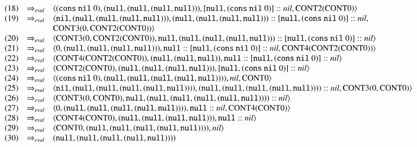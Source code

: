\documentclass{article}
\begin{document}
\[\begin{array}{crl}
  (18) & \estep & \langle
  (\cons~\nil~0),
  (\null, (\null, (\null, \null))),
  [\null, (\cons~\nil~0)] :: \nils,
  \cont{2}(\cont{0})
  \rangle \\

  (19) & \estep & \langle
  \nil,
  (\null, (\null, (\null, \null))),
  (\null, (\null, (\null, \null))) :: [\null, (\cons~\nil~0)] :: \nils,\\
  & \br &
  \cont{3}(0, \cont{2}(\cont{0}))
  \rangle \\

  (20) & \estep & \langle
  \cont{3}(0, \cont{2}(\cont{0})),
  \null,
  (\null, (\null, (\null, \null))) :: [\null, (\cons~\nil~0)] :: \nils
  \rangle \\


  (21) & \estep & \langle
  0,
  (\null, (\null, (\null, \null))),
  \null :: [\null, (\cons~\nil~0)] :: \nils,
  \cont{4}(\cont{2}(\cont{0}))
  \rangle \\

  (22) & \estep & \langle
  \cont{4}(\cont{2}(\cont{0})),
  (\null, (\null, \null)),
  \null :: [\null, (\cons~\nil~0)] :: \nils
  \rangle \\

  (23) & \estep & \langle
  \cont{2}(\cont{0}),
  (\null, (\null, (\null, \null))),
  [\null, (\cons~\nil~0)] :: \nils
  \rangle \\

  (24) & \estep & \langle
  (\cons~\nil~0),
  (\null, (\null, (\null, (\null, \null)))),
  \nils,
  \cont{0}
  \rangle \\

  (25) & \estep & \langle
  \nil,
  (\null, (\null, (\null, (\null, \null)))),
  (\null, (\null, (\null, (\null, \null)))) :: \nils,
  \cont{3}(0, \cont{0})
  \rangle \\

  (26) & \estep & \langle
  \cont{3}(0, \cont{0}),
  \null,
  (\null, (\null, (\null, (\null, \null)))) :: \nils
  \rangle \\

  (27) & \estep & \langle
  0,
  (\null, (\null, (\null, (\null, \null)))),
  \null :: \nils,
  \cont{4}(\cont{0})
  \rangle \\

  (28) & \estep & \langle
  \cont{4}(\cont{0}),
  (\null, (\null, (\null, \null))),
  \null :: \nils
  \rangle \\

  (29) & \estep & \langle
  \cont{0},
  (\null, (\null, (\null, (\null, \null)))),
  \nils
  \rangle \\

  (30) & \estep & (\null, (\null, (\null, (\null, \null))))

\end{array}
\]
\end{document}

